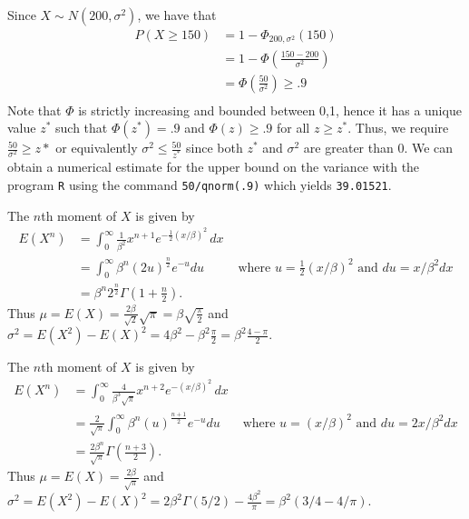 \documentclass{homework}
\begin{document}
\begin{solution}
  Since $X\sim N(200,\sigma^2)$, we have that 
  \begin{align*}
    P(X\ge 150) &= 1 - \Phi_{200,\sigma^2}(150) \\
    &= 1-\Phi\left(\frac{150-200}{\sigma^2}\right) \\
    &= \Phi\left(\frac{50}{\sigma^2}\right) \ge .9 \\
  \end{align*}
  Note that $\Phi$ is strictly increasing and bounded between 0,1, hence it has a unique value $z^*$ such that $\Phi(z^*) = .9$ and $\Phi(z) \ge .9$ for all $z \ge z^*$.  Thus, we require $\frac{50}{\sigma^2} \ge z*$ or equivalently $\sigma^2\le \frac{50}{z^*}$ since both $z^*$ and $\sigma^2$ are greater than 0.  We can obtain a numerical estimate for the upper bound on the variance with the program \texttt{R} using the command \texttt{50/qnorm(.9)} which yields \texttt{39.01521}.
\end{solution}


\begin{solution}
The $n$th moment of $X$ is given by
\begin{align*}
E(X^n) &= \int_0^\infty \frac{1}{\beta^2} x^{n+1} e^{-\frac12 (x/\beta)^2}\,dx\\
  &= \int_0^\infty \beta^n (2u)^{\frac n2} e^{-u}du &\text{ where }u = \frac12 (x/\beta)^2\text{ and }du = x/\beta^2 dx \\
  &= \beta^{n}2^{\frac n2} \Gamma\left(1+\frac n2\right).
\end{align*}
Thus $\mu = E(X) = \frac {2\beta}{ \sqrt 2} \sqrt{\pi} = \beta\sqrt{\frac{\pi}{2}}$ and $\sigma^2 = E(X^2) - E(X)^2 = 4 \beta^2 - \beta^2 \frac{\pi}{2} = \beta^2\frac{4-\pi}{2}$.
\end{solution}
\newpage


\begin{solution}
The $n$th moment of $X$ is given by
\begin{align*}
E(X^n) &= \int_0^\infty \frac{4}{\beta^3 \sqrt\pi} x^{n+2} e^{-(x/\beta)^2}\,dx\\
  &= \frac 2{\sqrt\pi}\int_0^\infty \beta^n (u)^{\frac{n+1}{2}} e^{-u}du &\text{ where }u = (x/\beta)^2\text{ and }du = 2x/\beta^2 dx \\
  &= \frac {2 \beta^n}{\sqrt\pi}\Gamma\left(\frac {n+3}2\right).
\end{align*}
Thus $\mu = E(X) =\frac{ 2 \beta}{\sqrt\pi}$ and $\sigma^2 = E(X^2) - E(X)^2 = 2 \beta^2\Gamma(5/2) - \frac{4 \beta^2}{\pi} = \beta^2(3/4 - 4/\pi)$.
\end{solution}
\end{document}
